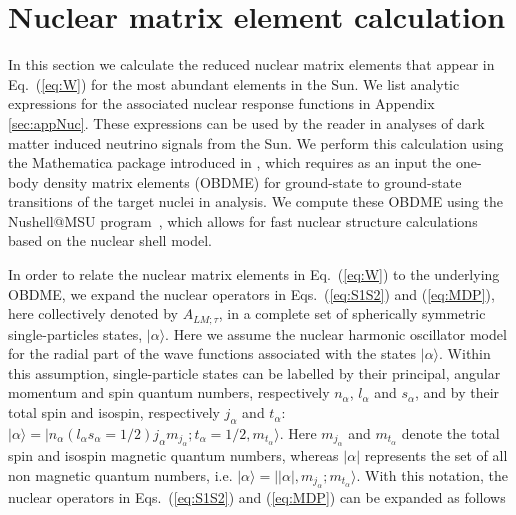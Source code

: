 \documentclass[11pt,a4paper]{article}
\begin{document}
\section{Nuclear matrix element calculation}
\label{sec:obdme}
In this section we calculate the reduced nuclear matrix elements that appear in Eq.~(\ref{eq:W}) for the most abundant elements in the Sun. We list analytic expressions for the associated nuclear response functions in Appendix \ref{sec:appNuc}. These expressions can be used by the reader in analyses of dark matter induced neutrino signals from the Sun. We perform this calculation using the {\sffamily Mathematica} package introduced in \cite{Anand:2013yka}, which requires as an input the one-body density matrix elements (OBDME) for ground-state to ground-state transitions of the target nuclei in analysis. We compute these OBDME using the {\sffamily Nushell@MSU} program~\cite{NuShell}, which allows for fast nuclear structure calculations based on the nuclear shell model.

In order to relate the nuclear matrix elements in Eq.~(\ref{eq:W}) to the underlying OBDME, we expand the nuclear operators in Eqs.~(\ref{eq:S1S2}) and (\ref{eq:MDP}), here collectively denoted by $A_{LM;\tau}$, in a complete set of spherically symmetric single-particles states, $|\alpha\rangle$. Here we assume the nuclear harmonic oscillator model for the radial part of the wave functions associated with the states $|\alpha\rangle$. Within this assumption, single-particle states can be labelled by their principal, angular momentum and spin quantum numbers, respectively $n_\alpha$, $l_\alpha$ and $s_\alpha$, and by their total spin and isospin, respectively $j_{\alpha}$ and $t_{\alpha}$: $|\alpha\rangle=|n_\alpha(l_\alpha s_\alpha=1/2)j_\alpha m_{j_\alpha};t_{\alpha}=1/2,m_{t_\alpha}\rangle$. Here $m_{j_\alpha}$ and $m_{t_\alpha}$ denote the total spin and isospin magnetic quantum numbers, whereas $|\alpha|$ represents the set of all non magnetic quantum numbers, i.e. $|\alpha\rangle=||\alpha|,m_{j_\alpha};m_{t_{\alpha}}\rangle$. With this notation, the nuclear operators in Eqs.~(\ref{eq:S1S2}) and (\ref{eq:MDP}) can be expanded as follows
 
\end{document}
